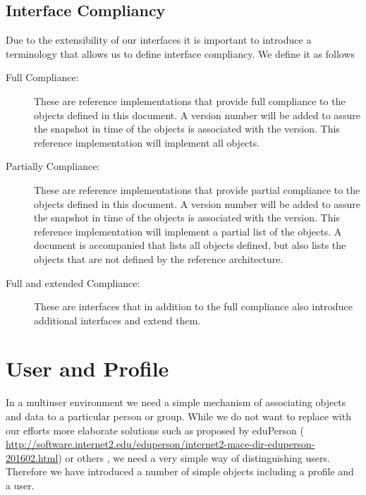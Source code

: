 \documentclass[9pt,twocolumn]{styles/osajnl}
\begin{document}
\subsection{Interface Compliancy}

Due to the extensibility of our interfaces it is important to
introduce a terminology that allows us to define interface
compliancy. We define it as follows

\begin{description}

\item[Full Compliance:] These are reference implementations that
  provide full compliance to the objects defined in this document. A
  version number will be added to assure the snapshot in time of the
  objects is associated with the version. This reference
  implementation will implement all objects.

\item[Partially Compliance:] These are reference implementations that
  provide partial compliance to the objects defined in this
  document. A version number will be added to assure the snapshot in
  time of the objects is associated with the version. This reference
  implementation will implement a partial list of the objects. A
  document is accompanied that lists all objects defined, but also
  lists the objects that are not defined by the reference
  architecture.

\item[Full and extended Compliance:] These are interfaces that in
  addition to the full compliance also introduce additional interfaces
  and extend them.

\end{description}

\section{User and Profile}

In a multiuser environment we need a simple mechanism of associating
objects and data to a particular person or group. While we do not want
to replace with our efforts more elaborate solutions such as proposed
by eduPerson (\url{
http://software.internet2.edu/eduperson/internet2-mace-dir-eduperson-201602.html})
or others , we need a very simple way of distinguishing
users. Therefore we have introduced a number of simple objects
including a profile and a user.
\end{document}
